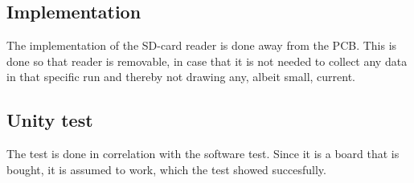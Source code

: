 \subsection{Implementation}
The implementation of the SD-card reader is done away from the PCB. This is done so that reader is removable, in case that it is not needed to collect any data in that specific run and thereby not drawing any, albeit small, current.  

\subsection{Unity test}
The test is done in correlation with the software test. Since it is a board that is bought, it is assumed to work, which the test showed succesfully. 